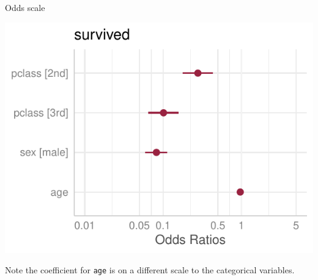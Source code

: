\documentclass[a4paper]{article}\usepackage[]{graphicx}\usepackage[]{xcolor}
\makeatletter
\def\maxwidth{ %
  \ifdim\Gin@nat@width>\linewidth
    \linewidth
  \else
    \Gin@nat@width
  \fi
}
\makeatother
\begin{document}
\begin{minipage}[t]{0.49\textwidth}
Odds scale
\begin{Schunk}


{\centering \includegraphics[width=\maxwidth]{figure/listings-unnamed-chunk-417-1} 

}

\end{Schunk}
\end{minipage}
Note the coefficient for \lstinline|age| is on a different scale to the categorical variables.
\end{document}
